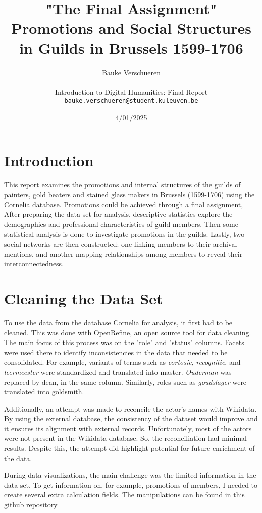 \documentclass[12pt]{article}
\title{%
  "The Final Assignment" \\
  \large Promotions and Social Structures in Guilds in Brussels 1599-1706}
\author{Bauke Verschueren \\ \\
Introduction to Digital Humanities: Final Report \\ {\tt bauke.verschueren@student.kuleuven.be}}
\date{4/01/2025}
\begin{document}
\maketitle



\section{Introduction}
\label{intro}

This report examines the promotions and internal structures of the guilds of painters, gold beaters and stained glass makers in Brussels (1599-1706) using the Cornelia database. Promotions could be achieved through a final assignment, After preparing the data set for analysis, descriptive statistics explore the demographics and professional characteristics of guild members. Then some statistical analysis is done to investigate promotions in the guilds. Lastly, two social networks are then constructed: one linking members to their archival mentions, and another mapping relationships among members to reveal their interconnectedness. 

\section{Cleaning the Data Set}
\label{label:Cleaning the Data Set}
To use the data from the database Cornelia for analysis, it first had to be cleaned. This was done with OpenRefine, an open source tool for data cleaning. The main focus of this process was on the "role" and "status" columns. Facets were used there to identify inconsistencies in the data that needed to be consolidated. For example, variants of terms such as \textit{cortosie}, \textit{recognitie}, and \textit{leermeester} were standardized and translated into master. \textit{Ouderman} was replaced by dean, in the same column. Similarly, roles such as \textit{goudslager} were translated into goldsmith. 

Additionally, an attempt was made to reconcile the actor's names with Wikidata. By using the external database, the consistency of the dataset would improve and it ensures its alignment with external records. Unfortunately, most of the actors were not present in the Wikidata database. So, the reconciliation had minimal results. Despite this, the attempt did highlight potential for future enrichment of the data. 

During data visualizations, the main challenge was the limited information in the data set. To get information on, for example, promotions of members, I needed to create several extra calculation fields. The manipulations can be found in this \href{https://github.com/Bauke-V/Cornelia.git}{github repository}
\end{document}

